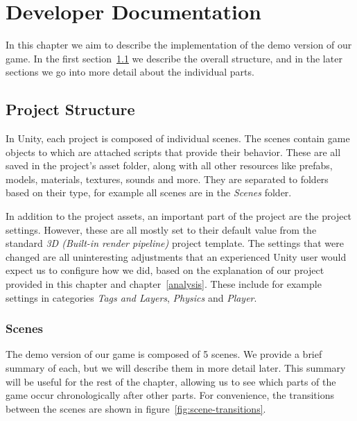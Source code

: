 \chapter{Developer Documentation}

In this chapter we aim to describe the implementation of the demo version of our game.
In the first section~\ref{sec:docs-proj} we describe the overall structure, and in the later sections we go into more detail about the individual parts.

\section{Project Structure}\label{sec:docs-proj}

In Unity, each project is composed of individual scenes.
The scenes contain game objects to which are attached scripts that provide their behavior.
These are all saved in the project's asset folder, along with all other resources like prefabs, models, materials, textures, sounds and more.
They are separated to folders based on their type, for example all scenes are in the \emph{Scenes} folder.

In addition to the project assets, an important part of the project are the project settings.
However, these are all mostly set to their default value from the standard \emph{3D (Built-in render pipeline)} project template.
The settings that were changed are all uninteresting adjustments that an experienced Unity user would expect us to configure how we did, based on the explanation of our project provided in this chapter and chapter~\ref{analysis}.
These include for example settings in categories \emph{Tags and Layers}, \emph{Physics} and \emph{Player}.

\subsection{Scenes}

The demo version of our game is composed of 5 scenes.
We provide a brief summary of each, but we will describe them in more detail later.
This summary will be useful for the rest of the chapter, allowing us to see which parts of the game occur chronologically after other parts.
For convenience, the transitions between the scenes are shown in figure~\ref{fig:scene-transitions}.

